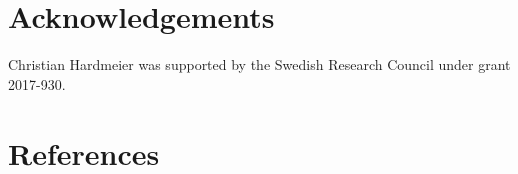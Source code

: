\documentclass[10pt, a4paper]{article}
\begin{document}
%
%
%
\section{Acknowledgements}
Christian Hardmeier was supported by the Swedish Research Council under grant 2017-930.
%
%
\section{References}

 


\end{document}

